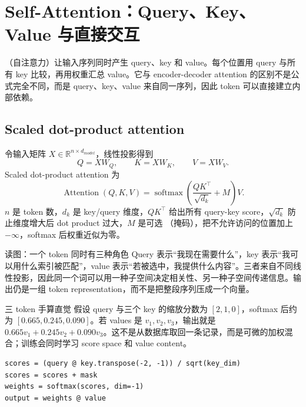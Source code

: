 \section{Self-Attention：Query、Key、Value 与直接交互}

（自注意力）让输入序列同时产生 query、key 和 value。每个位置用 query 与所有 key 比较，再用权重汇总 value。它与 encoder-decoder attention 的区别不是公式完全不同，而是 query、key、value 来自同一序列，因此 token 可以直接建立内部依赖。

\subsection{Scaled dot-product attention}

令输入矩阵 $X\in\mathbb{R}^{n\times d_{model}}$，线性投影得到
\[
Q=XW_Q,\qquad K=XW_K,\qquad V=XW_V.
\]
Scaled dot-product attention 为
\[
\operatorname{Attention}(Q,K,V)
=\operatorname{softmax}\!\left(\frac{QK^\top}{\sqrt{d_k}}+M\right)V.
\]
$n$ 是 token 数，$d_k$ 是 key/query 维度，$QK^\top$ 给出所有 query-key score，$\sqrt{d_k}$ 防止维度增大后 dot product 过大，$M$ 是可选 （掩码），把不允许访问的位置加上 $-\infty$，softmax 后权重近似为零。


\begin{knowledgebox}{读图：一个 token 同时有三种角色}
Query 表示“我现在需要什么”，key 表示“我可以用什么索引被匹配”，value 表示“若被选中，我提供什么内容”。三者来自不同线性投影，因此同一个词可以用一种子空间决定相关性、另一种子空间传递信息。输出仍是一组 token representation，而不是把整段序列压成一个向量。
\end{knowledgebox}

\begin{importantbox}{三 token 手算直觉}
假设 query 与三个 key 的缩放分数为 $[2,1,0]$，softmax 后约为 $[0.665,0.245,0.090]$。若 values 是 $v_1,v_2,v_3$，输出就是 $0.665v_1+0.245v_2+0.090v_3$。这不是从数据库取回一条记录，而是可微的加权混合；训练会同时学习 score space 和 value content。
\end{importantbox}

\begin{lstlisting}[caption={Scaled dot-product attention 的最小伪代码}]
scores = (query @ key.transpose(-2, -1)) / sqrt(key_dim)
scores = scores + mask
weights = softmax(scores, dim=-1)
output = weights @ value
\end{lstlisting}

